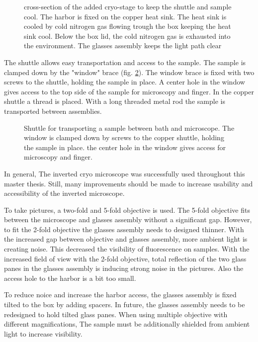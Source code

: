 \begin{figure}[hbt!]
	\centering
	
	\caption{cross-section of the added cryo-stage to keep the shuttle and sample cool. The harbor is fixed on the copper heat sink. The heat sink is cooled by cold nitrogen gas flowing trough the box keeping the heat sink cool. Below the box lid, the cold nitrogen gas is exhausted into the environment. The glasses assembly keeps the light path clear}
	\label{fig:boxmikroskop}
\end{figure}

The shuttle allows easy transportation and access to the sample. The sample is clamped down by the "window" brace (fig. \ref{fig:shuttle}). The window brace is fixed with two screws to the shuttle, holding the sample in place. A center hole in the window gives access to the top side of the sample for microscopy and finger. In the copper shuttle a thread is placed. With a long threaded metal rod the sample is transported between assemblies.

\begin{figure}[hbt!]
	\centering
	
	\caption{Shuttle for transporting a sample between bath and microscope. The window is clamped down by screws to the copper shuttle, holding the sample in place. the center hole in the window gives access for microscopy and finger.}
	\label{fig:shuttle}
\end{figure}

In general, The inverted cryo microscope was successfully used throughout this master thesis. Still, many improvements should be made to increase usability and accessibility of the inverted microscope. 

To take pictures, a two-fold and 5-fold objective is used. The 5-fold objective fits between the microscope and glasses assembly without a significant gap. However, to fit the 2-fold objective the glasses assembly needs to designed thinner. With the increased gap between objective and glasses assembly, more ambient light is creating noise. This decreased the visibility of fluorescence on samples. With the increased field of view with the 2-fold objective, total reflection of the two glass panes in the glasses assembly is inducing strong noise in the pictures. Also the access hole to the harbor is a bit too small. 

To reduce noice and increase the harbor access, the glasses assembly is fixed tilted to the box by adding spacers. In future, the glasses assembly needs to be redesigned to hold tilted glass panes. When using multiple objective with different magnifications, The sample must be additionally shielded from ambient light to increase visibility.

